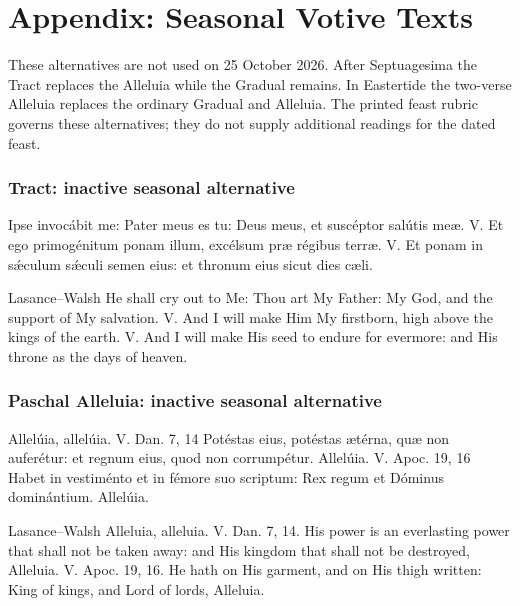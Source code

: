 \section{Appendix: Seasonal Votive Texts}
These alternatives are not used on 25 October 2026. After Septuagesima the Tract replaces the Alleluia while the Gradual remains. In Eastertide the two-verse Alleluia replaces the ordinary Gradual and Alleluia. The printed feast rubric governs these alternatives; they do not supply additional readings for the dated feast.
\subsubsection{Tract: inactive seasonal alternative}
\begin{latinproper}
Ipse invocábit me: Pater meus es tu: Deus meus, et suscéptor salútis meæ. \textnormal{V.} Et ego primogénitum ponam illum, excélsum præ régibus terræ. \textnormal{V.} Et ponam in sǽculum sǽculi semen eius: et thronum eius sicut dies cæli.
\end{latinproper}
\begin{englishwitness}{Lasance--Walsh}
He shall cry out to Me: Thou art My Father: My God, and the support of My salvation. \textnormal{V.} And I will make Him My firstborn, high above the kings of the earth. \textnormal{V.} And I will make His seed to endure for evermore: and His throne as the days of heaven.
\end{englishwitness}
\subsubsection{Paschal Alleluia: inactive seasonal alternative}
\begin{latinproper}
Allelúia, allelúia. \textnormal{V.} \textnormal{Dan. 7, 14} Potéstas eius, potéstas ætérna, quæ non auferétur: et regnum eius, quod non corrumpétur. Allelúia. \textnormal{V.} \textnormal{Apoc. 19, 16} Habet in vestiménto et in fémore suo scriptum: Rex regum et Dóminus dominántium. Allelúia.
\end{latinproper}
\begin{englishwitness}{Lasance--Walsh}
Alleluia, alleluia. \textnormal{V.} \textnormal{Dan. 7, 14.} His power is an everlasting power that shall not be taken away: and His kingdom that shall not be destroyed, Alleluia. \textnormal{V.} \textnormal{Apoc. 19, 16.} He hath on His garment, and on His thigh written: King of kings, and Lord of lords, Alleluia.
\end{englishwitness}

